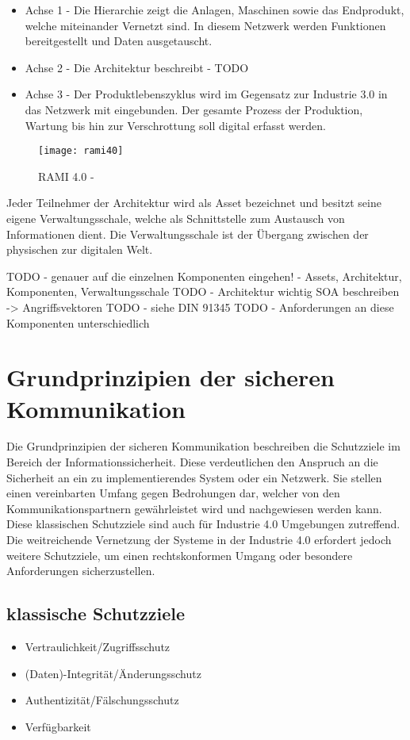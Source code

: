 \begin{itemize}
  \item Achse 1 - Die Hierarchie zeigt die Anlagen, Maschinen sowie das Endprodukt, welche miteinander Vernetzt sind. In diesem Netzwerk werden Funktionen bereitgestellt und Daten ausgetauscht.
  \item Achse 2 - Die Architektur beschreibt - TODO
  \item Achse 3 - Der Produktlebenszyklus wird im Gegensatz zur Industrie 3.0 in das Netzwerk mit eingebunden. Der gesamte Prozess der Produktion, Wartung bis hin zur Verschrottung soll digital erfasst werden.
\end{itemize}

\begin{figure}[h]
  \centering
  \texttt{[image: rami40]}
  \caption{RAMI 4.0 - \cite{rami2016}}
  \label{Kap2:RAMI 4.0}
\end{figure}

\clearpage

Jeder Teilnehmer der Architektur wird als Asset bezeichnet und besitzt seine eigene Verwaltungsschale, welche als Schnittstelle zum Austausch von Informationen dient. Die Verwaltungsschale ist der Übergang zwischen der physischen zur digitalen Welt.

TODO - genauer auf die einzelnen Komponenten eingehen! - Assets, Architektur, Komponenten, Verwaltungsschale
TODO - Architektur wichtig SOA beschreiben -> Angriffsvektoren
TODO - siehe DIN 91345
TODO - Anforderungen an diese Komponenten unterschiedlich

\section{Grundprinzipien der sicheren Kommunikation}
Die Grundprinzipien der sicheren Kommunikation beschreiben die Schutzziele im Bereich der Informationssicherheit. Diese verdeutlichen den Anspruch an die Sicherheit an ein zu implementierendes System oder ein Netzwerk. Sie stellen einen vereinbarten Umfang gegen Bedrohungen dar, welcher von den Kommunikationspartnern gewährleistet wird und nachgewiesen werden kann. Diese klassischen Schutzziele sind auch für Industrie 4.0 Umgebungen zutreffend. Die weitreichende Vernetzung der Systeme in der Industrie 4.0 erfordert jedoch weitere Schutzziele, um einen rechtskonformen Umgang oder besondere Anforderungen sicherzustellen.

\subsection{klassische Schutzziele}
\begin{itemize}
  \item Vertraulichkeit/Zugriffsschutz
  \item (Daten)-Integrität/Änderungsschutz
  \item Authentizität/Fälschungsschutz
  \item Verfügbarkeit
\end{itemize}

